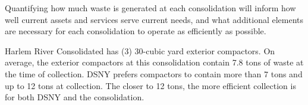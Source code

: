 
    Quantifying how much waste is generated at each consolidation will inform how well current assets and services serve current needs, and what additional elements are necessary for each consolidation to operate as efficiently as possible.
    
    Harlem River Consolidated has (3) 30-cubic yard exterior compactors. On average, the exterior compactors at this consolidation contain 7.8 tons of waste at the time of collection. DSNY prefers compactors to contain more than 7 tons and up to 12 tons at collection. The closer to 12 tons, the more efficient collection is for both DSNY and the consolidation.